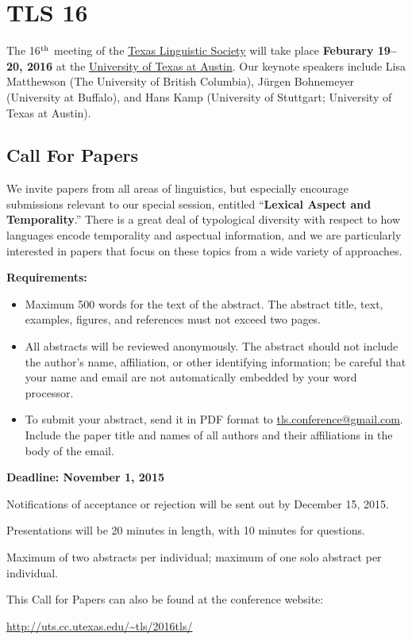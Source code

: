 \documentclass[11pt]{article}
\begin{document}
\clearpage\thispagestyle{empty}

\section*{TLS 16}

The 16$^{\rm th}$ meeting of the \href{http://uts.cc.utexas.edu/~tls}{Texas Linguistic Society} will take place \textbf{Feburary 19--20, 2016} at the \href{https://www.utexas.edu/cola/depts/linguistics/}{University of Texas at Austin}. Our keynote speakers include Lisa Matthewson (The University of British Columbia), J{\"u}rgen Bohnemeyer (University at Buffalo), and Hans Kamp (University of Stuttgart; University of Texas at Austin).

\subsection*{Call For Papers}

We invite papers from all areas of linguistics, but especially encourage submissions relevant to our special session, entitled ``\textbf{Lexical Aspect and Temporality}.'' There is a great deal of typological diversity with respect to how languages encode temporality and aspectual information, and we are particularly interested in papers that focus on these topics from a wide variety of approaches.

\bigskip\noindent
\textbf{Requirements:}

\begin{itemize}
  \setlength{\itemsep}{2pt}
  \setlength{\parskip}{2pt}
  \item Maximum 500 words for the text of the abstract. The abstract title, text, examples, figures, and references must not exceed two pages.
  \item All abstracts will be reviewed anonymously. The abstract should not include the author’s name, affiliation, or other identifying information; be careful that your name and email are not automatically embedded by your word processor.
  \item To submit your abstract, send it in PDF format to \href{mailto:tls.conference@gmail.com}{tls.conference@gmail.com}. Include the paper title and names of all authors and their affiliations in the body of the email.
\end{itemize}

\textbf{Deadline: November 1, 2015}

\bigskip\noindent
Notifications of acceptance or rejection will be sent out by December 15, 2015.

\medskip\noindent
Presentations will be 20 minutes in length, with 10 minutes for questions.

\medskip\noindent
Maximum of two abstracts per individual; maximum of one solo abstract per individual.

\medskip\noindent
This Call for Papers can also be found at the conference website:

\medskip
\url{http://uts.cc.utexas.edu/~tls/2016tls/}
\end{document}
